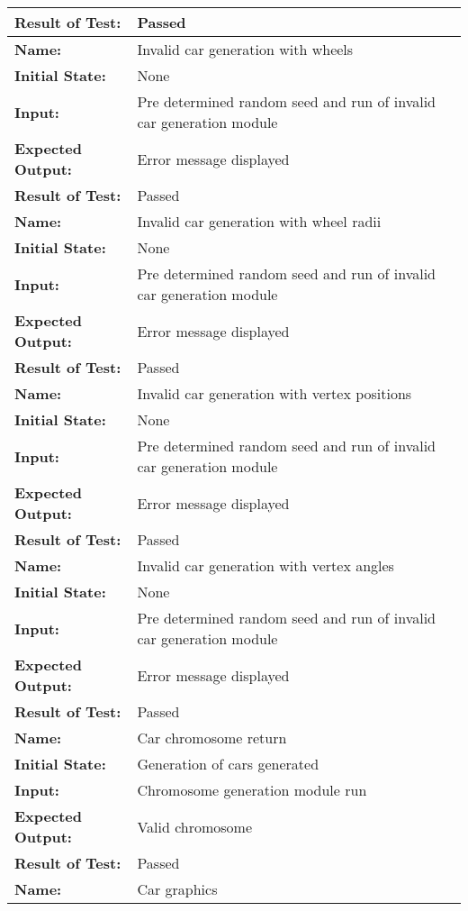 \documentclass[12pt, titlepage]{article}
\begin{document}
\begin{center}
\begin{longtable}{ l | p{10cm} }
\textbf{Result of Test:} & Passed\\
\hline
\rule{0pt}{1.5em}\textbf{Name:} & Invalid car generation with wheels\\
\textbf{Initial State:} & None\\
\textbf{Input:} & Pre determined random seed and run of invalid car generation module\\
\textbf{Expected Output:} & Error message displayed\\[0.6em]
\textbf{Result of Test:} & Passed\\
\hline
\rule{0pt}{1.5em}\textbf{Name:} & Invalid car generation with wheel radii\\
\textbf{Initial State:} & None\\
\textbf{Input:} & Pre determined random seed and run of invalid car generation module\\
\textbf{Expected Output:} & Error message displayed\\[0.6em]
\textbf{Result of Test:} & Passed\\
\hline
\rule{0pt}{1.5em}\textbf{Name:} & Invalid car generation with vertex positions\\
\textbf{Initial State:} & None\\
\textbf{Input:} & Pre determined random seed and run of invalid car generation module\\
\textbf{Expected Output:} & Error message displayed\\[0.6em]
\textbf{Result of Test:} & Passed\\
\hline
\rule{0pt}{1.5em}\textbf{Name:} & Invalid car generation with vertex angles\\
\textbf{Initial State:} & None\\
\textbf{Input:} & Pre determined random seed and run of invalid car generation module\\
\textbf{Expected Output:} &Error message displayed\\[0.6em]
\textbf{Result of Test:} & Passed\\
\hline
\rule{0pt}{1.5em}\textbf{Name:} & Car chromosome return\\
\textbf{Initial State:} & Generation of cars generated\\
\textbf{Input:} & Chromosome generation module run\\
\textbf{Expected Output:} & Valid chromosome\\[0.6em]
\textbf{Result of Test:} & Passed\\
\hline
\rule{0pt}{1.5em}\textbf{Name:} & Car graphics\\

\end{longtable}
\end{center}
\end{document}
